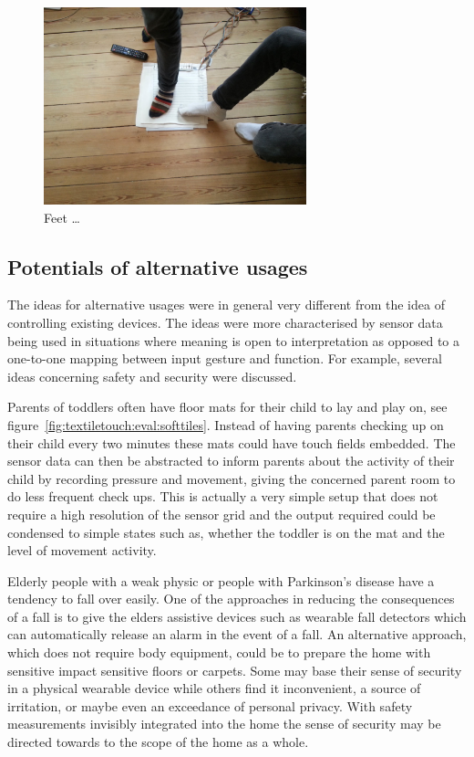 \begin{figure}[h]
  \centering
      \includegraphics[width=3in]{figures/touch/evaluation/sebastian/feet}
  \caption[Feet \dots]
  {Feet \dots}
  \label{fig:textiletouch:eval:sebastian:feet}
\end{figure}


\subsection{Potentials of alternative usages}

The ideas for alternative usages were in general very different from the idea of controlling existing devices.
The ideas were more characterised by sensor data being used in situations where meaning is open to interpretation as opposed to a one-to-one mapping between input gesture and function.
For example, several ideas concerning safety and security were discussed.

Parents of toddlers often have floor mats for their child to lay and play on, see figure~\ref{fig:textiletouch:eval:softtiles}.
Instead of having parents checking up on their child every two minutes these mats could have touch fields embedded.
The sensor data can then be abstracted to inform parents about the activity of their child by recording pressure and movement, giving the concerned parent room to do less frequent check ups.
This is actually a very simple setup that does not require a high resolution of the sensor grid and the output required could be condensed to simple states such as, whether the toddler is on the mat and the level of movement activity.

Elderly people with a weak physic or people with Parkinson's disease have a tendency to fall over easily.
One of the approaches in reducing the consequences of a fall is to give the elders assistive devices such as wearable fall detectors which can automatically release an alarm in the event of a fall.
An alternative approach, which does not require body equipment, could be to prepare the home with sensitive impact sensitive floors or carpets.
Some may base their sense of security in a physical wearable device while others find it inconvenient, a source of irritation, or maybe even an exceedance of personal privacy. 
With safety measurements invisibly integrated into the home the sense of security may be directed towards to the scope of the home as a whole.

